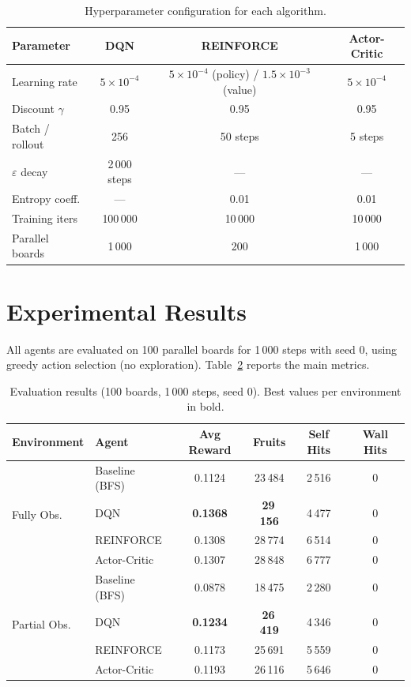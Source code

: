 \documentclass[11pt, a4paper]{article}
\begin{document}
\begin{table}[H]
\centering
\small
\begin{tabular}{lccc}
\toprule
\textbf{Parameter} & \textbf{DQN} & \textbf{REINFORCE} & \textbf{Actor-Critic} \\
\midrule
Learning rate     & $5 \times 10^{-4}$ & $5 \times 10^{-4}$ (policy) / $1.5 \times 10^{-3}$ (value) & $5 \times 10^{-4}$ \\
Discount $\gamma$ & 0.95 & 0.95 & 0.95 \\
Batch / rollout   & 256 & 50 steps & 5 steps \\
$\varepsilon$ decay & 2\,000 steps & --- & --- \\
Entropy coeff.    & --- & 0.01 & 0.01 \\
Training iters    & 100\,000 & 10\,000 & 10\,000 \\
Parallel boards   & 1\,000 & 200 & 1\,000 \\
\bottomrule
\end{tabular}
\caption{Hyperparameter configuration for each algorithm.}
\label{tab:hyperparams}
\end{table}


\section{Experimental Results}

All agents are evaluated on 100 parallel boards for 1\,000 steps with seed 0, using greedy
action selection (no exploration). Table~\ref{tab:results} reports the main metrics.

\begin{table}[H]
\centering
\small
\begin{tabular}{llcccc}
\toprule
\textbf{Environment} & \textbf{Agent} & \textbf{Avg Reward} & \textbf{Fruits} & \textbf{Self Hits} & \textbf{Wall Hits} \\
\midrule
\multirow{4}{*}{Fully Obs.}
 & Baseline (BFS) & 0.1124 & 23\,484 & 2\,516 & 0 \\
 & DQN            & \textbf{0.1368} & \textbf{29\,156} & 4\,477 & 0 \\
 & REINFORCE      & 0.1308 & 28\,774 & 6\,514 & 0 \\
 & Actor-Critic   & 0.1307 & 28\,848 & 6\,777 & 0 \\
\midrule
\multirow{4}{*}{Partial Obs.}
 & Baseline (BFS) & 0.0878 & 18\,475 & 2\,280 & 0 \\
 & DQN            & \textbf{0.1234} & \textbf{26\,419} & 4\,346 & 0 \\
 & REINFORCE      & 0.1173 & 25\,691 & 5\,559 & 0 \\
 & Actor-Critic   & 0.1193 & 26\,116 & 5\,646 & 0 \\
\bottomrule
\end{tabular}
\caption{Evaluation results (100 boards, 1\,000 steps, seed 0). Best values per environment
in bold.}
\label{tab:results}
\end{table}
\end{document}

